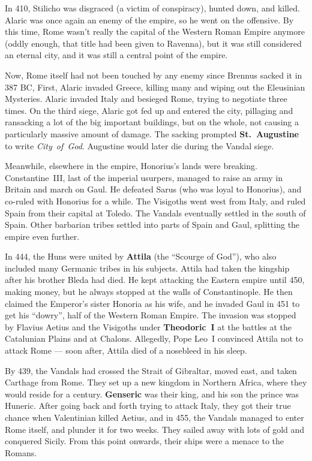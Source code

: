 In 410, Stilicho was disgraced (a victim of conspiracy), hunted down, and killed.
Alaric was once again an enemy of the empire, so he went on the offensive.
By this time, Rome wasn't really the capital of the Western Roman Empire anymore
(oddly enough, that title had been given to Ravenna),
but it was still considered an eternal city, and it was still a central point of the empire.

Now, Rome itself had not been touched by any enemy since Brennus sacked it in 387 BC,
First, Alaric invaded Greece, killing many and wiping out the Eleusinian Mysteries.
Alaric invaded Italy and besieged Rome, trying to negotiate three times.
On the third siege, Alaric got fed up and entered the city,
pillaging and ransacking a lot of the big important buildings,
but on the whole, not causing a particularly massive amount of damage.
The sacking prompted \textbf{St.\ Augustine} to write \textit{City~of~God}.
Augustine would later die during the Vandal siege.

Meanwhile, elsewhere in the empire, Honorius's lands were breaking.
Constantine~III, last of the imperial usurpers, managed to raise an army in Britain and march on Gaul.
He defeated Sarus (who was loyal to Honorius), and co-ruled with Honorius for a while.
The Visigoths went west from Italy, and ruled Spain from their capital at Toledo.
The Vandals eventually settled in the south of Spain.
Other barbarian tribes settled into parts of Spain and Gaul, splitting the empire even further.

In 444, the Huns were united by \textbf{Attila} (the ``Scourge of God''),
who also included many Germanic tribes in his subjects.
Attila had taken the kingship after his brother Bleda had died.
He kept attacking the Eastern empire until 450, making money,
but he always stopped at the walls of Constantinople.
He then claimed the Emperor's sister Honoria as his wife,
and he invaded Gaul in 451 to get his ``dowry'', half of the Western Roman Empire.
The invasion was stopped by Flavius Aetius and the Visigoths under \textbf{Theodoric~I}
at the battles at the Catalunian Plains and at Chalons.
Allegedly, Pope Leo~I convinced Attila not to attack Rome ---
soon after, Attila died of a nosebleed in his sleep.

By 439, the Vandals had crossed the Strait of Gibraltar, moved east, and taken Carthage from Rome.
They set up a new kingdom in Northern Africa, where they would reside for a century.
\textbf{Genseric} was their king, and his son the prince was Huneric.
After going back and forth trying to attack Italy, they got their true chance when Valentinian killed Aetius,
and in 455, the Vandals managed to enter Rome itself, and plunder it for two weeks.
They sailed away with lots of gold and conquered Sicily.
From this point onwards, their ships were a menace to the Romans.

